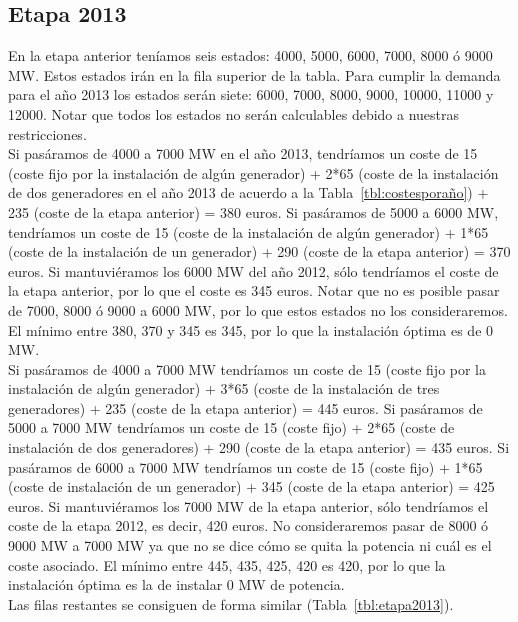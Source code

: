 \documentclass[12pt,a4paper,twoside,openright,titlepage,final]{article}
\begin{document}
\subsection{Etapa 2013}

En la etapa anterior teníamos seis estados: 4000, 5000, 6000, 7000, 8000 ó 9000 MW. Estos estados irán en la fila superior de la tabla. Para cumplir la demanda para el año 2013 los estados serán siete: 6000, 7000, 8000, 9000, 10000, 11000 y 12000. Notar que todos los estados no serán calculables debido a nuestras restricciones.\\

Si pasáramos de 4000 a 7000 MW en el año 2013, tendríamos un coste de 15 (coste fijo por la instalación de algún generador) + 2*65 (coste de la instalación de dos generadores en el año 2013 de acuerdo a la Tabla~\ref{tbl:costesporaño}) + 235 (coste de la etapa anterior) = 380 euros. Si pasáramos de 5000 a 6000 MW, tendríamos un coste de 15 (coste de la instalación de algún generador) + 1*65 (coste de la instalación de un generador) + 290 (coste de la etapa anterior) = 370 euros. Si mantuviéramos los 6000 MW del año 2012, sólo tendríamos el coste de la etapa anterior, por lo que el coste es 345 euros. Notar que no es posible pasar de 7000, 8000 ó 9000 a 6000 MW, por lo que estos estados no los consideraremos. El mínimo entre 380, 370 y 345 es 345, por lo que la instalación óptima es de 0 MW.\\

Si pasáramos de 4000 a 7000 MW tendríamos un coste de 15 (coste fijo por la instalación de algún generador) + 3*65 (coste de la instalación de tres generadores) + 235 (coste de la etapa anterior) = 445 euros. Si pasáramos de 5000 a 7000 MW tendríamos un coste de 15 (coste fijo) + 2*65 (coste de instalación de dos generadores) + 290 (coste de la etapa anterior) = 435 euros. Si pasáramos de 6000 a 7000 MW tendríamos un coste de 15 (coste fijo) + 1*65 (coste de instalación de un generador) + 345 (coste de la etapa anterior) = 425 euros. Si mantuviéramos los 7000 MW de la etapa anterior, sólo tendríamos el coste de la etapa 2012, es decir, 420 euros. No consideraremos pasar de 8000 ó 9000 MW a 7000 MW ya que no se dice cómo se quita la potencia ni cuál es el coste asociado. El mínimo entre 445, 435, 425, 420 es 420, por lo que la instalación óptima es la de instalar 0 MW de potencia.\\

Las filas restantes se consiguen de forma similar (Tabla~\ref{tbl:etapa2013}).\\ 
\end{document}
